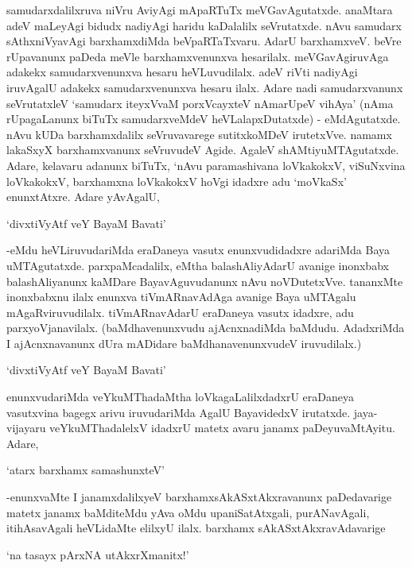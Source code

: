 samudarxdalilxruva niVru AviyAgi mApaRTuTx meVGavAgutatxde. anaMtara adeV maLeyAgi bidudx nadiyAgi haridu kaDalalilx seVrutatxde. nAvu samudarx sAthxniVyavAgi barxhamxdiMda beVpaRTaTxvaru. AdarU barxhamxveV. beVre rUpavanunx paDeda meVle barxhamxvenunxva hesarilalx. meVGavAgiruvAga adakekx samudarxvenunxva hesaru heVLuvudilalx. adeV riVti nadiyAgi iruvAgalU adakekx samudarxvenunxva hesaru ilalx. Adare nadi samudarxvanunx seVrutatxleV 
`samudarx iteyxVvaM porxVcayxteV nAmarUpeV vihAya' (nAma rUpagaLanunx biTuTx samudarxveMdeV heVLalapxDutatxde) - eMdAgutatxde. nAvu kUDa barxhamxdalilx seVruvavarege sutitxkoMDeV irutetxVve. namamx lakaSxyX barxhamxvanunx seVruvudeV Agide. AgaleV shAMtiyuMTAgutatxde. Adare, kelavaru adanunx biTuTx, `nAvu paramashivana loVkakokxV, viSuNxvina loVkakokxV, barxhamxna loVkakokxV hoVgi idadxre adu `moVkaSx' enunxtAtxre. Adare yAvAgalU, 

\begin{shloka}
`divxtiVyAtf veY BayaM Bavati'
\end{shloka}

-eMdu heVLiruvudariMda eraDaneya vasutx enunxvudidadxre adariMda Baya uMTAgutatxde. parxpaMcadalilx, eMtha balashAliyAdarU avanige inonxbabx balashAliyanunx kaMDare BayavAguvudanunx nAvu noVDutetxVve. tananxMte inonxbabxnu ilalx enunxva tiVmARnavAdAga avanige Baya uMTAgalu mAgaRviruvudilalx. tiVmARnavAdarU eraDaneya vasutx idadxre, adu parxyoVjanavilalx. (baMdhavenunxvudu ajAcnxnadiMda baMdudu. AdadxriMda I ajAcnxnavanunx dUra mADidare baMdhanavenunxvudeV iruvudilalx.)

\begin{shloka}
`divxtiVyAtf veY BayaM Bavati'
\end{shloka}

enunxvudariMda veYkuMThadaMtha loVkagaLalilxdadxrU eraDaneya vasutxvina bagegx arivu iruvudariMda AgalU BayavidedxV irutatxde. jaya-vijayaru veYkuMThadalelxV idadxrU matetx avaru janamx paDeyuvaMtAyitu. Adare,

\begin{shloka}
`atarx barxhamx samashunxteV'
\end{shloka}

-enunxvaMte I janamxdalilxyeV barxhamxsAkASxtAkxravanunx paDedavarige matetx janamx baMditeMdu yAva oMdu upaniSatAtxgali, purANavAgali, itihAsavAgali heVLidaMte elilxyU ilalx. barxhamx sAkASxtAkxravAdavarige

\begin{shloka}
`na tasayx pArxNA utAkxrXmanitx!'
\end{shloka}


